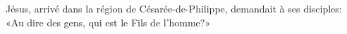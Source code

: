 \encetemps Jésus, arrivé dans la région de Césarée-de-Philippe,
	demandait à ses disciples:
	«Au dire des gens, qui est le Fils de l’homme?»
